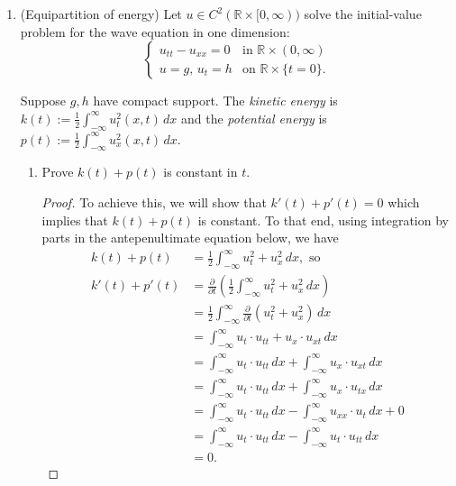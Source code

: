 \documentclass[11pt,oneside,english]{amsart}
\theoremstyle{definition}
\newcommand{\aspace}{\hspace{7mm}\text{and}\hspace{7mm}}
\newcommand{\pp}[2]{\frac{\partial{#1}}{\partial{#2}}}
\newcommand{\MB}[1]{\mathbb{#1}}
\begin{document}
\begin{enumerate}
\begin{proof}
so $\mathbf{B}$ satisfies the wave equation. Similarly, 

\[
\text{curl}(\text{curl }\mathbf{E})=\text{curl}(\text{curl}(-\mathbf{B}_t))=-\mathbf{E}_{tt}\aspace \text{curl}(\text{curl }\mathbf{E})=-\Delta\mathbf{E},\text{ so}
\]
\[
\mathbf{E}_{tt}-\Delta\mathbf{E}=0
\]
and $\mathbf{E}$ solves the wave equation as well.
\end{proof}

\item (Equipartition of energy) Let $u\in C^2(\MB{R}\times[0,\infty))$ solve the initial-value problem for the wave equation in one dimension:
\[
\begin{cases}u_{tt}-u_{xx}=0 & \text{in }\MB{R}\times(0,\infty) \\ u=g,\,u_t=h & \text{on }\MB{R}\times\{t=0\}.\end{cases}
\]

Suppose $g,h$ have compact support. The \textit{kinetic energy} is $k(t):=\frac{1}{2}\int_{-\infty}^\infty u_t^2(x,t)\,dx$ and the \textit{potential energy} is $p(t):=\frac{1}{2}\int_{-\infty}^\infty u_x^2(x,t)\,dx$.

\begin{enumerate}
\itemsep7mm
\item Prove $k(t)+p(t)$ is constant in $t$.

\begin{proof}
To achieve this, we will show that $k'(t)+p'(t)=0$ which implies that $k(t)+p(t)$ is constant. To that end, using integration by parts in the antepenultimate equation below, we have
\begin{align*}
k(t)+p(t)&=\frac{1}{2}\int_{-\infty}^\infty u_t^2+u_x^2\,dx,\text{ so}\\[2mm]
k'(t)+p'(t)&=\pp{}{t}\left(\frac{1}{2}\int_{-\infty}^\infty u_t^2+u_x^2\,dx\right)\\[2mm]
&=\frac{1}{2}\int_{-\infty}^\infty \pp{}{t}\left(u_t^2+u_x^2\right)\,dx\\[2mm]
&=\int_{-\infty}^\infty u_t\cdot u_{tt}+u_x\cdot u_{xt}\,dx\\[2mm]
&=\int_{-\infty}^\infty u_t\cdot u_{tt}\,dx+\int_{-\infty}^\infty u_x\cdot u_{xt}\,dx\\[2mm]
&=\int_{-\infty}^\infty u_t\cdot u_{tt}\,dx+\int_{-\infty}^\infty u_x\cdot u_{tx}\,dx\\[2mm]
&=\int_{-\infty}^\infty u_t\cdot u_{tt}\,dx-\int_{-\infty}^\infty u_{xx}\cdot u_{t}\,dx+0\\[2mm]
&=\int_{-\infty}^\infty u_t\cdot u_{tt}\,dx-\int_{-\infty}^\infty u_t\cdot u_{tt}\,dx\\[2mm]
&=0.
\end{align*}
\end{proof}


\end{enumerate}
\end{enumerate}
\end{document}
